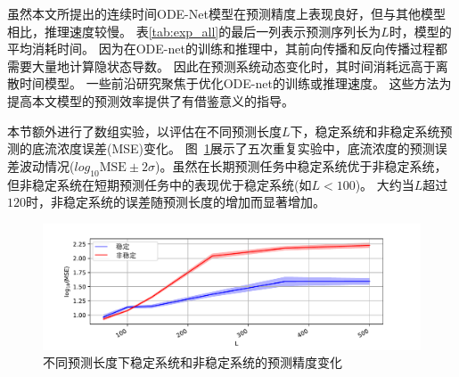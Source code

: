 虽然本文所提出的连续时间ODE-Net模型在预测精度上表现良好，但与其他模型相比，推理速度较慢。
表\ref{tab:exp_all}的最后一列表示预测序列长为$L$时，模型的平均消耗时间。
因为在ODE-net的训练和推理中，其前向传播和反向传播过程都需要大量地计算隐状态导数。
因此在预测系统动态变化时，其时间消耗远高于离散时间模型。
一些前沿研究\cite{J2020,poli2020,kelly2020}聚焦于优化ODE-net的训练或推理速度。
这些方法为提高本文模型的预测效率提供了有借鉴意义的指导。


本节额外进行了数组实验，以评估在不同预测长度$L$下，稳定系统和非稳定系统预测的底流浓度误差(MSE)变化。
图~\ref{fig:length_cmp}展示了五次重复实验中，底流浓度的预测误差波动情况($ log_{10}{\text{MSE}} \pm 2\sigma$)。虽然在长期预测任务中稳定系统优于非稳定系统，但非稳定系统在短期预测任务中的表现优于稳定系统(如$L<100$)。
大约当$L$超过$120$时，非稳定系统的误差随预测长度的增加而显著增加。
\begin{figure}[h]
    \centering
    \includegraphics[width=\linewidth,trim=50 0 50 10, clip]{figures/chapter3/length_cmp.pdf}
    \caption{
    不同预测长度下稳定系统和非稳定系统的预测精度变化
    }
    \label{fig:length_cmp}
\end{figure}

